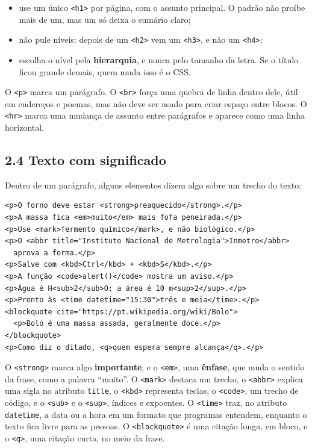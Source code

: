 \begin{itemize}
  \item use um único \texttt{<h1>} por página, com o assunto principal. O padrão não proíbe mais de um, mas um só deixa o sumário claro;
  \item não pule níveis: depois de um \texttt{<h2>} vem um \texttt{<h3>}, e não um \texttt{<h4>};
  \item escolha o nível pela \textbf{hierarquia}, e nunca pelo tamanho da letra. Se o título ficou grande demais, quem muda isso é o CSS.
\end{itemize}

O \texttt{<p>} marca um parágrafo. O \texttt{<br>} força uma quebra de linha dentro dele, útil em endereços e poemas, mas não deve ser usado para criar espaço entre blocos. O \texttt{<hr>} marca uma mudança de assunto entre parágrafos e aparece como uma linha horizontal.

\subsection{2.4 Texto com significado}

Dentro de um parágrafo, alguns elementos dizem algo sobre um trecho do texto:

\begin{codigo}
\begin{Verbatim}[breaklines=true, breaksymbolleft={}, fontsize=\footnotesize]
<p>O forno deve estar <strong>preaquecido</strong>.</p>
<p>A massa fica <em>muito</em> mais fofa peneirada.</p>
<p>Use <mark>fermento químico</mark>, e não biológico.</p>
<p>O <abbr title="Instituto Nacional de Metrologia">Inmetro</abbr>
  aprova a forma.</p>
<p>Salve com <kbd>Ctrl</kbd> + <kbd>S</kbd>.</p>
<p>A função <code>alert()</code> mostra um aviso.</p>
<p>Água é H<sub>2</sub>O; a área é 10 m<sup>2</sup>.</p>
<p>Pronto às <time datetime="15:30">três e meia</time>.</p>
<blockquote cite="https://pt.wikipedia.org/wiki/Bolo">
  <p>Bolo é uma massa assada, geralmente doce.</p>
</blockquote>
<p>Como diz o ditado, <q>quem espera sempre alcança</q>.</p>
\end{Verbatim}
\end{codigo}

O \texttt{<strong>} marca algo \textbf{importante}, e o \texttt{<em>}, uma \textbf{ênfase}, que muda o sentido da frase, como a palavra ``muito''. O \texttt{<mark>} destaca um trecho, o \texttt{<abbr>} explica uma sigla no atributo \texttt{title}, o \texttt{<kbd>} representa teclas, o \texttt{<code>}, um trecho de código, e o \texttt{<sub>} e o \texttt{<sup>}, índices e expoentes. O \texttt{<time>} traz, no atributo \texttt{datetime}, a data ou a hora em um formato que programas entendem, enquanto o texto fica livre para as pessoas. O \texttt{<blockquote>} é uma citação longa, em bloco, e o \texttt{<q>}, uma citação curta, no meio da frase.

